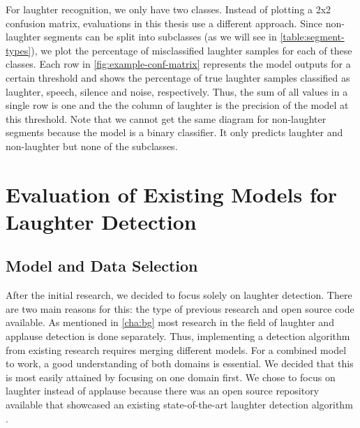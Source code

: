 \documentclass[bsc,frontabs,parskip,deptreport]{infthesis}
\begin{document}
For laughter recognition, we only have two classes. Instead of plotting a 2x2 confusion matrix, evaluations in this thesis use a different approach.
Since non-laughter segments can be split into subclasses (as we will see in \autoref{table:segment-types}), we plot the percentage of misclassified laughter samples for each of these classes. 
Each row in \autoref{fig:example-conf-matrix} represents the model outputs for a certain threshold and shows the percentage of true laughter samples classified as laughter, speech, silence and noise, respectively. Thus, the sum of all values in a single row is one and the the column of laughter is the precision of the model at this threshold.
Note that we cannot get the same diagram for non-laughter segments because the model is a binary classifier. It only predicts laughter and non-laughter but none of the subclasses. 


\chapter{Evaluation of Existing Models for Laughter Detection} \label{cha:model-evaluation}

\section{Model and Data Selection}\label{sec:model-and-data}
After the initial research, we decided to focus solely on laughter detection. 
There are two main reasons for this: the type of previous research and open source code available.  
As mentioned in \autoref{cha:bg} most research in the field of laughter and applause detection is done separately. 
Thus, implementing a detection algorithm from existing research requires merging different models. 
For a combined model to work, a good understanding of both domains is essential.
We decided that this is most easily attained by focusing on one domain first. 
We chose to focus on laughter instead of applause because there was an open source repository available that showcased an existing state-of-the-art laughter detection algorithm \citep{gillick-codebase, gillick2021robust}.
\end{document}
